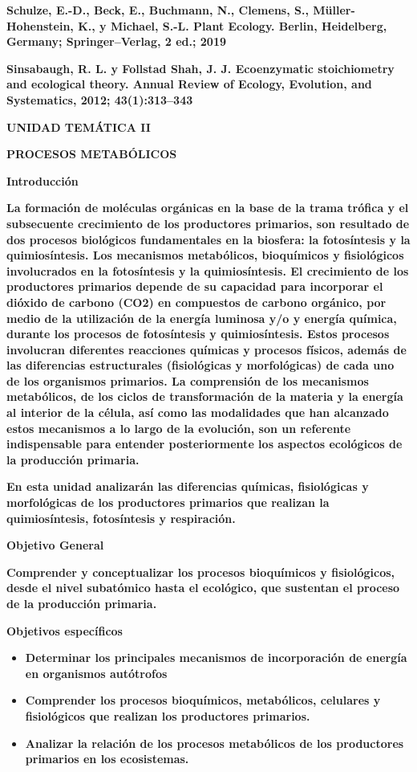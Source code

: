\documentclass[
]{article}
\begin{document}
\textbf{Schulze, E.-D., Beck, E., Buchmann, N., Clemens, S.,
Müller-Hohenstein, K., y Michael, S.-L. Plant Ecology. Berlin,
Heidelberg, Germany; Springer--Verlag, 2 ed.; 2019}

\textbf{Sinsabaugh, R. L. y Follstad Shah, J. J. Ecoenzymatic
stoichiometry and ecological theory. Annual Review of Ecology,
Evolution, and Systematics, 2012; 43(1):313--343}

\textbf{\hfill\break
}

\textbf{UNIDAD TEMÁTICA II}

\textbf{PROCESOS METABÓLICOS}

\textbf{Introducción}

\textbf{La formación de moléculas orgánicas en la base de la trama
trófica y el subsecuente crecimiento de los productores primarios, son
resultado de dos procesos biológicos fundamentales en la biosfera: la
fotosíntesis y la quimiosíntesis. Los mecanismos metabólicos,
bioquímicos y fisiológicos involucrados en la fotosíntesis y la
quimiosíntesis. El crecimiento de los productores primarios depende de
su capacidad para incorporar el dióxido de carbono (CO2) en compuestos
de carbono orgánico, por medio de la utilización de la energía luminosa
y/o y energía química, durante los procesos de fotosíntesis y
quimiosíntesis. Estos procesos involucran diferentes reacciones químicas
y procesos físicos, además de las diferencias estructurales
(fisiológicas y morfológicas) de cada uno de los organismos primarios.
La comprensión de los mecanismos metabólicos, de los ciclos de
transformación de la materia y la energía al interior de la célula, así
como las modalidades que han alcanzado estos mecanismos a lo largo de la
evolución, son un referente indispensable para entender posteriormente
los aspectos ecológicos de la producción primaria.}

\textbf{En esta unidad analizarán las diferencias químicas, fisiológicas
y morfológicas de los productores primarios que realizan la
quimiosíntesis, fotosíntesis y respiración.}

\textbf{Objetivo General}

\textbf{Comprender y conceptualizar los procesos bioquímicos y
fisiológicos, desde el nivel subatómico hasta el ecológico, que
sustentan el proceso de la producción primaria.}

\textbf{Objetivos específicos}

\begin{itemize}
\item
  \textbf{Determinar los principales mecanismos de incorporación de
  energía en organismos autótrofos}
\item
  \textbf{Comprender los procesos bioquímicos, metabólicos, celulares y
  fisiológicos que realizan los productores primarios.}
\item
  \textbf{Analizar la relación de los procesos metabólicos de los
  productores primarios en los ecosistemas.}
\end{itemize}
\end{document}
